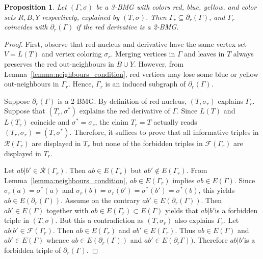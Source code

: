 \documentclass[final,3p,times]{elsarticle}
\newtheorem{proposition}[theorem]{Proposition}%
\begin{document}
\begin{proposition}
\label{prop:nucleus2BMG}
Let $(\Gamma,\sigma)$ be a 3-BMG with colors red, blue, yellow, and color sets $R,B,Y$ respectively, explained by $(T,\sigma)$. Then $\Gamma_r\subseteq \partial_r(\Gamma)$, and $\Gamma_r$ coincides with $\partial_r(\Gamma)$ if the red derivative is a 2-BMG.
\end{proposition}
\begin{proof}
First, observe that red-nucleus and derivative have the same vertex set $V=L(T)$ and vertex coloring $\sigma_r$. Merging vertices in $\Gamma$ and leaves in $T$ always preserves the red out-neighbours in $B\cup Y$. However, from Lemma~\ref{lemma:neighbours_condition}, red vertices may lose some blue or yellow out-neighbours in $\Gamma_r$. Hence, $\Gamma_r$ is an induced subgraph of $\partial_r(\Gamma)$.

Suppose $\partial_r(\Gamma)$ is a 2-BMG. By definition of red-nucleus, $(T,\sigma_r)$ explains $\Gamma_r$. Suppose that $(T_r,\sigma^*)$ explains the red derivative of $\Gamma$.
Since $L(T)$ and $L(T_r)$ coincide and $\sigma^*=\sigma_r$, the claim $T_r=T$ actually reads $(T_r,\sigma_r)=(T, \sigma^*)$. Therefore, it suffices to prove that all informative triples in $\mathscr{R}(\Gamma_r)$ are displayed in $T_r$ but none of the forbidden triples in $\mathscr{F}(\Gamma_r)$ are displayed in $T_r$.

Let $ab|b'\in \mathscr{R}(\Gamma_r)$. Then $ab\in E(\Gamma_r)$ but $ab'\not\in E(\Gamma_r)$. From Lemma~\ref{lemma:neighbours_condition}, $ab\in E(\Gamma_r)$ implies $ab\in E(\Gamma)$. Since $\sigma_r(a)=\sigma^*(a)$ and $\sigma_r(b)=\sigma_r(b')=\sigma^*(b')=\sigma^*(b)$, this yields
$ab\in E(\partial_r(\Gamma))$. Assume on the contrary $ab'\in E(\partial_r(\Gamma))$. Then $ab'\in E(\Gamma)$ together with $ab\in E(\Gamma_r)\subset E(\Gamma)$ yields that $ab|b'$is a forbidden triple in $(T,\sigma)$. But this a contradiction as $(T,\sigma_r)$ also explains $\Gamma_r$.
Let $ab|b'\in\mathscr{F}(\Gamma_r)$. Then $ab\in E(\Gamma_r)$ and $ab'\in E(\Gamma_r)$. Thus $ab\in E(\Gamma)$ and $ab'\in E(\Gamma)$ whence $ab\in E(\partial_r(\Gamma))$ and $ab'\in E(\partial_r\Gamma))$. Therefore $ab|b'$is a forbidden triple of $\partial_r(\Gamma)$.
\end{proof}
\end{document}
